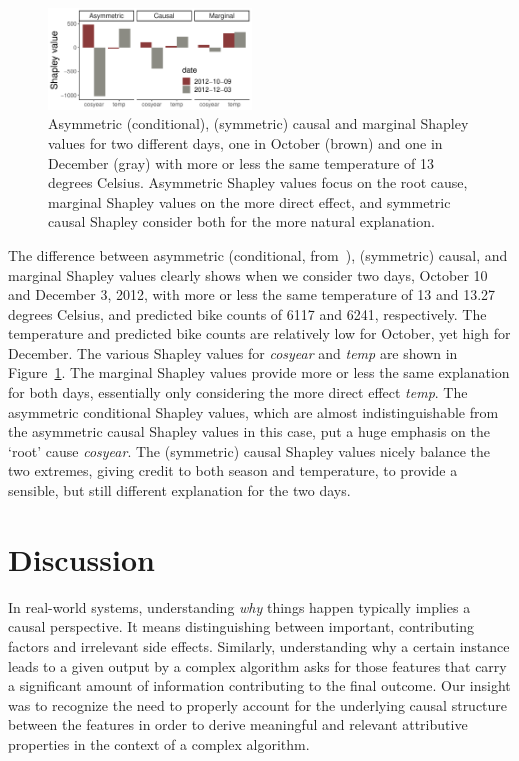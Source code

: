 \documentclass{article}
\newcommand{\comment}[1]{{\color{red} #1}}
\begin{document}
\begin{figure}
	\begin{center}
		\includegraphics[width=0.48\textwidth]{figures/final_bar_plots.pdf}
	\end{center}
	\caption{Asymmetric (conditional), (symmetric) causal and marginal Shapley values for two different days, one in October (brown) and one in December (gray) with more or less the same temperature of 13 degrees Celsius. Asymmetric Shapley values focus on the root cause, marginal Shapley values on the more direct effect, and symmetric causal Shapley consider both for the more natural explanation.}
	\label{fig:barplots}
\end{figure}
The difference between asymmetric (conditional, from~\cite{frye2019asymmetric}), (symmetric) causal, and marginal Shapley values clearly shows when we consider two days, October 10 and December 3, 2012, with more or less the same temperature of 13 and 13.27 degrees Celsius, and predicted bike counts of 6117 and 6241, respectively. The temperature and predicted bike counts are relatively low for October, yet high for December. The various Shapley values for {\em cosyear} and {\em temp} are shown in Figure~\ref{fig:barplots}. The marginal Shapley values provide more or less the same explanation for both days, essentially only considering the more direct effect {\em temp}. The asymmetric conditional Shapley values, which are almost indistinguishable from the asymmetric causal Shapley values in this case, put a huge emphasis on the `root' cause {\em cosyear}. The (symmetric) causal Shapley values nicely balance the two extremes, giving credit to both season and temperature, to provide a sensible, but still different explanation for the two days.



\section{Discussion}

In real-world systems, understanding {\em why} things happen typically implies a causal perspective. It means distinguishing between important, contributing factors and irrelevant side effects. Similarly, understanding why a certain instance leads to a given output by a complex algorithm asks for those features that carry a significant amount of information contributing to the final outcome. Our insight was to recognize the need to properly account for the underlying causal structure between the features in order to derive meaningful and relevant attributive properties in the context of a complex algorithm.
\end{document}
